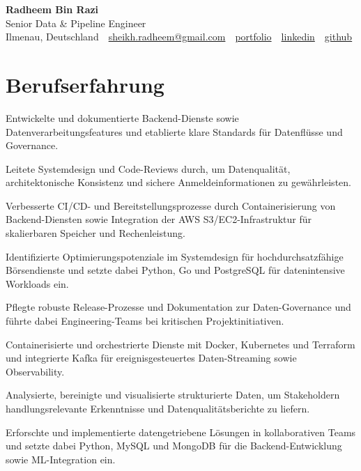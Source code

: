 \documentclass[11pt,a4paper]{resume}
\makeatletter
\newcommand{\Portfolio}{https://radheem.github.io/my-cv}
\newcommand{\PortfolioText}{portfolio}
\newcommand{\GitHub}{https://github.com/radheem}
\newcommand{\LinkedIn}{https://www.linkedin.com/in/radheem-razi}
\newcommand{\Email}{sheikh.radheem@gmail.com}
\makeatother
\begin{document}
\clearpage
{}

\begin{center}
  {\huge\bfseries Radheem Bin Razi}\\[3pt]
  {\large Senior Data \& Pipeline Engineer}\\[6pt]
  \small
  Ilmenau, Deutschland \,\textbar\,
  \href{mailto:\Email}{\Email} \,\textbar\,
  \href{\Portfolio}{\PortfolioText} \,\textbar\,
  \href{\LinkedIn}{linkedin} \,\textbar\,
  \href{\GitHub}{github}
\end{center}
\vspace{2pt}

\section{Berufserfahrung}

\bullets
  \item Entwickelte und dokumentierte Backend-Dienste sowie Datenverarbeitungsfeatures und etablierte klare Standards für Datenflüsse und Governance.
  \item Leitete Systemdesign und Code-Reviews durch, um Datenqualität, architektonische Konsistenz und sichere Anmeldeinformationen zu gewährleisten.
  \item Verbesserte CI/CD- und Bereitstellungsprozesse durch Containerisierung von Backend-Diensten sowie Integration der AWS S3/EC2-Infrastruktur für skalierbaren Speicher und Rechenleistung.
\bulletsend
\vspace{3pt}
\bullets
  \item Identifizierte Optimierungspotenziale im Systemdesign für hochdurchsatzfähige Börsendienste und setzte dabei Python, Go und PostgreSQL für datenintensive Workloads ein.
  \item Pflegte robuste Release-Prozesse und Dokumentation zur Daten-Governance und führte dabei Engineering-Teams bei kritischen Projektinitiativen.
  \item Containerisierte und orchestrierte Dienste mit Docker, Kubernetes und Terraform und integrierte Kafka für ereignisgesteuertes Daten-Streaming sowie Observability.
\bulletsend
\vspace{3pt}
\bullets
  \item Analysierte, bereinigte und visualisierte strukturierte Daten, um Stakeholdern handlungsrelevante Erkenntnisse und Datenqualitätsberichte zu liefern.
  \item Erforschte und implementierte datengetriebene Lösungen in kollaborativen Teams und setzte dabei Python, MySQL und MongoDB für die Backend-Entwicklung sowie ML-Integration ein.
\bulletsend
\vspace{3pt}
\end{document}
